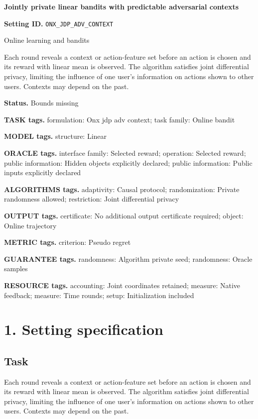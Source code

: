 \documentclass[10pt,a4paper]{article}
\begin{document}
\raggedright

{\LARGE\bfseries\sffamily\color{AtlasNavy} Jointly private linear bandits with predictable adversarial contexts\par}\vspace{5pt}
\textbf{Setting ID.} \texttt{ONX\_\allowbreak{}\allowbreak{}JDP\_\allowbreak{}\allowbreak{}ADV\_\allowbreak{}\allowbreak{}CONTEXT}

Online learning and bandits

Each round reveals a context or action-feature set before an action is chosen and its reward with linear mean is observed. The algorithm satisfies joint differential privacy, limiting the influence of one user's information on actions shown to other users. Contexts may depend on the past.

\textbf{Status.} Bounds missing

\textbf{TASK tags.} formulation: Onx jdp adv context; task family: Online bandit

\textbf{MODEL tags.} structure: Linear

\textbf{ORACLE tags.} interface family: Selected reward; operation: Selected reward; public information: Hidden objects explicitly declared; public information: Public inputs explicitly declared

\textbf{ALGORITHMS tags.} adaptivity: Causal protocol; randomization: Private randomness allowed; restriction: Joint differential privacy

\textbf{OUTPUT tags.} certificate: No additional output certificate required; object: Online trajectory

\textbf{METRIC tags.} criterion: Pseudo regret

\textbf{GUARANTEE tags.} randomness: Algorithm private seed; randomness: Oracle samples

\textbf{RESOURCE tags.} accounting: Joint coordinates retained; measure: Native feedback; measure: Time rounds; setup: Initialization included

\section{1. Setting specification}
\subsection{Task}
Each round reveals a context or action-feature set before an action is chosen and its reward with linear mean is observed. The algorithm satisfies joint differential privacy, limiting the influence of one user's information on actions shown to other users. Contexts may depend on the past.
\end{document}
